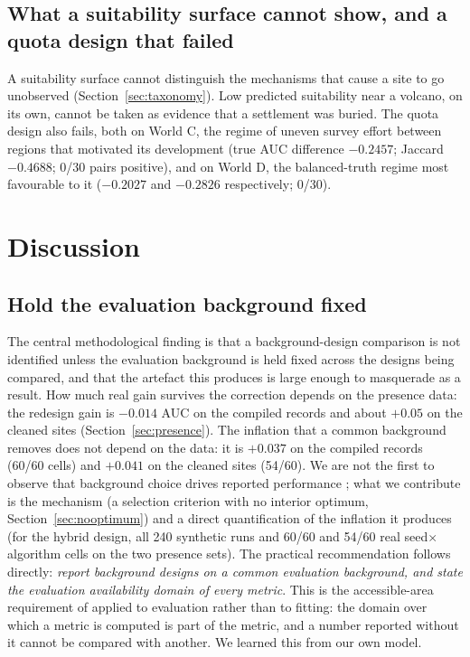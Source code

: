 \documentclass[12pt]{article}
\begin{document}
\subsection{What a suitability surface cannot show, and a quota design that failed}
\label{sec:withdrawal}

A suitability surface cannot distinguish the mechanisms that cause a site to go unobserved (Section~\ref{sec:taxonomy}).
Low predicted suitability near a volcano, on its own, cannot be taken as evidence that a settlement was buried.
The quota design also fails, both on World C, the regime of uneven survey effort between regions that motivated its development (true AUC difference $-0.2457$; Jaccard $-0.4688$; 0/30 pairs positive), and on World D, the balanced-truth regime most favourable to it ($-0.2027$ and $-0.2826$ respectively; 0/30).

\section{Discussion}

\subsection{Hold the evaluation background fixed}

The central methodological finding is that a background-design comparison is not identified unless the evaluation background is held fixed across the designs being compared, and that the artefact this produces is large enough to masquerade as a result.
How much real gain survives the correction depends on the presence data: the redesign gain is $-0.014$ AUC on the compiled records and about $+0.05$ on the cleaned sites (Section~\ref{sec:presence}).
The inflation that a common background removes does not depend on the data: it is $+0.037$ on the compiled records (60/60 cells) and $+0.041$ on the cleaned sites (54/60).
We are not the first to observe that background choice drives reported performance \citep{phillips2009, lobo2008, hijmans2012}; what we contribute is the mechanism (a selection criterion with no interior optimum, Section~\ref{sec:nooptimum}) and a direct quantification of the inflation it produces (for the hybrid design, all 240 synthetic runs and 60/60 and 54/60 real seed$\times$algorithm cells on the two presence sets).
The practical recommendation follows directly: \emph{report background designs on a common evaluation background, and state the evaluation availability domain of every metric}.
This is the accessible-area requirement of \citet{barve2011} applied to evaluation rather than to fitting: the domain over which a metric is computed is part of the metric, and a number reported without it cannot be compared with another.
We learned this from our own model.
\end{document}
